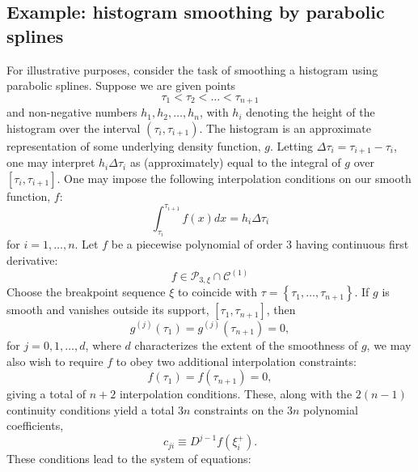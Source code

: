 \documentclass[12pt]{article}
\newcommand{\PP}{\mathcal{P}}
\theoremstyle{definition}
\begin{document}
\subsection{Example: histogram smoothing by parabolic splines}
For illustrative purposes, consider the task of smoothing a histogram using parabolic splines. Suppose we are given points
\[
\tau_1 < \tau_2 < \dots < \tau_{n+1}
\]
and non-negative numbers $h_1, h_2, \dots, h_n$, with $h_i$ denoting the height of the histogram over the interval $\left(\tau_i, \tau_{i+1} \right)$. The histogram is an approximate representation of some underlying density function, $g$. Letting $\Delta \tau_i = \tau_{i+1}-\tau_i$, one may interpret $h_i\Delta \tau_i$ as (approximately) equal to the integral of $g$ over $\left[\tau_i, \tau_{i+1} \right]$. One may impose the following interpolation conditions on our smooth function, $f$:
\begin{equation*} 
\int_{\tau_i}^{\tau_{i+1}} f\left(x\right)dx = h_i\Delta \tau_i
\end{equation*} 
\noindent
for $i=1,\dots, n$. Let $f$ be a piecewise polynomial of order 3 having continuous first derivative:
\[
f \in \PP_{3,\xi} \cap \mathcal{C}^{\left(1\right)}
\]
Choose the breakpoint sequence $\xi$ to coincide with $\tau = \left\{\tau_1,\dots, \tau_{n+1} \right\}$. If $g$ is smooth and vanishes outside its support, $\left[ \tau_1,\tau_{n+1} \right]$, then
\[
g^{\left( j \right)}\left(\tau_1\right) = g^{\left( j \right)}\left(\tau_{n+1}\right) = 0,
\]
\noindent
for $j=0,1,\dots,d$, where $d$ characterizes the extent of the smoothness of $g$, we may also wish to require $f$ to obey two additional interpolation constraints:
\[
f\left( \tau_1 \right) = f\left( \tau_{n+1} \right) = 0,
\]
giving a total of $n+2$ interpolation conditions. These, along with the $2\left(n-1\right)$ continuity conditions yield a total $3n$ constraints on the $3n$ polynomial coefficients,
\[
c_{ji} \equiv D^{j-1} f\left(\xi_i^+ \right).
\]
These conditions lead to the system of equations:
\end{document}
